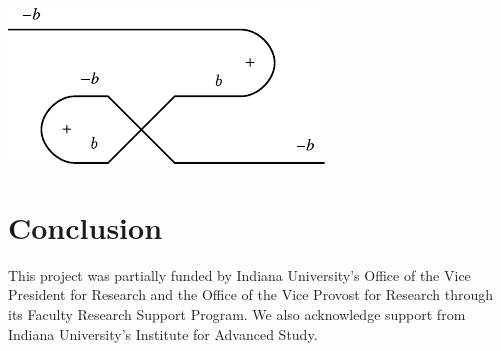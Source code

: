 \documentclass[preprint]{sigplanconf}
\begin{document}
\begin{itemize}
\begin{center}
  \includegraphics{diagrams/neg_circuit2.pdf}
\end{center}




\end{itemize}






\section{Conclusion}

\acks This project was partially funded by Indiana University's Office
of the Vice President for Research and the Office of the Vice Provost
for Research through its Faculty Research Support Program.  We also
acknowledge support from Indiana University's Institute for Advanced
Study.

\begin{small}


\end{small}
\end{document}
